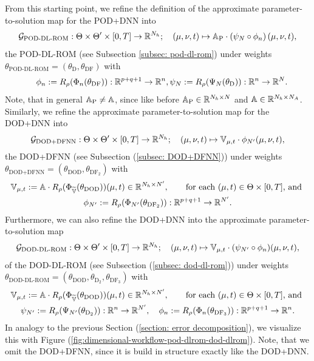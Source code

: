 From this starting point, we refine the definition of the approximate parameter-to-solution map for the POD+DNN into 
\begin{equation*}
    \mathcal{G}_\text{POD-DL-ROM} : \Theta \times \Theta' \times [0, T] \to \mathbb{R}^{N_h}; \quad (\mu, \nu, t)
    \mapsto \mathbb{A}_\text{P} \cdot \left( \psi_N \circ \phi_n \right) (\mu, \nu, t),
\end{equation*}
the POD-DL-ROM (see Subsection \ref{subsec: pod-dl-rom}) 
under weights $\theta_\text{POD-DL-ROM} = (\theta_\text{D}, \theta_\text{DF})$ with 
\begin{equation*}
    \quad \phi_n := R_\rho(\Phi_n(\theta_\text{DF})): \mathbb{R}^{p+q+1} \to \mathbb{R}^n,
    \psi_N := R_\rho(\Psi_N(\theta_\text{D})): \mathbb{R}^n \to \mathbb{R}^{N}.
\end{equation*}
Note, that in general $\mathbb{A}_\text{P} \neq \mathbb{A}$, since like before
$\mathbb{A}_\text{P} \in \mathbb{R}^{N_h \times N}$
and $\mathbb{A} \in \mathbb{R}^{N_h \times N_A}$. Similarly, we refine the approximate parameter-to-solution map for the DOD+DNN into
\begin{equation*}
    \mathcal{G}_\text{DOD+DFNN} : \Theta \times \Theta' \times [0, T] \to \mathbb{R}^{N_h}; \quad (\mu, \nu, t)
    \mapsto \mathbb{V}_{\mu, t} \cdot \phi_{N'}(\mu, \nu, t),
\end{equation*}
the DOD+DFNN (see Subsection (\ref{subsec: DOD+DFNN}))
under weights $\theta_\text{DOD+DFNN} = (\theta_\text{DOD}, \theta_{\text{DF}_2})$ with
\begin{gather*}
    \mathbb{V}_{\mu, t} := \mathbb{A} \cdot R_\rho(\Phi_{\widetilde{\mathbb{V}}}(\theta_\text{DOD}))(\mu, t) \in \mathbb{R}^{N_h \times N'},
    \qquad \text{for each } (\mu, t) \in \Theta \times [0, T] \text{, and } \\
    \phi_{N'} := R_\rho(\Phi_{N'}(\theta_{\text{DF}_2})): \mathbb{R}^{p+q+1} \to \mathbb{R}^{N'}.
\end{gather*} 
Furthermore, we can also refine the DOD+DNN into the approximate parameter-to-solution map
\begin{equation*}
    \mathcal{G}_\text{DOD-DL-ROM} : \Theta \times \Theta' \times [0, T] \to \mathbb{R}^{N_h}; \quad (\mu, \nu, t)
    \mapsto \mathbb{V}_{\mu, t} \cdot (\psi_{N'} \circ \phi_n)(\mu, \nu, t),
\end{equation*}
of the DOD-DL-ROM (see Subsection (\ref{subsec: dod-dl-rom})) 
under weights $\theta_\text{DOD-DL-ROM} = (\theta_\text{DOD}, \theta_{\text{D}_2}, 
\theta_{\text{DF}_3})$ with
\begin{gather*}
    \mathbb{V}_{\mu, t} := \mathbb{A} \cdot R_\rho(\Phi_{\widetilde{\mathbb{V}}}(\theta_\text{DOD}))(\mu, t) \in \mathbb{R}^{N_h \times N'},
    \qquad \text{for each } (\mu, t) \in \Theta \times [0, T] \text{, and } \\
    \psi_{N'} := R_\rho(\Psi_{N'}(\theta_{\text{D}_2})): \mathbb{R}^n \to \mathbb{R}^{N'}, \quad
    \phi_{n} := R_\rho(\Phi_n(\theta_{\text{DF}_3})): \mathbb{R}^{p+q+1} \to \mathbb{R}^n.
\end{gather*}
In analogy to the previous Section (\ref{section: error decomposition}), we visualize this with
Figure (\ref{fig:dimensional-workflow-pod-dlrom-dod-dlrom}). Note, that we omit the DOD+DFNN, since
it is build in structure exactly like the DOD+DNN.


